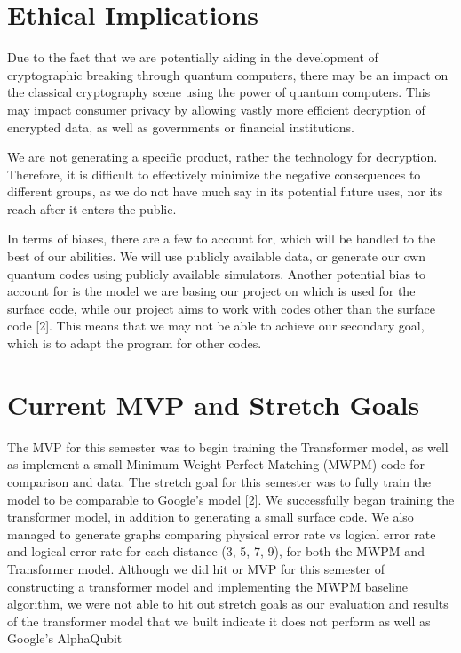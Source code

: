 \documentclass[12pt]{article}
\begin{document}
\section{Ethical Implications}

Due to the fact that we are potentially aiding in the development of cryptographic breaking through quantum computers, there may be an impact on the classical 
cryptography scene using the power of quantum computers. This may impact consumer privacy by allowing vastly more efficient decryption of encrypted data, 
as well as governments or financial institutions. 

We are not generating a specific product, rather the technology for decryption. 
Therefore, it is difficult to effectively minimize the negative consequences to different groups, as we do not have much say in its potential 
future uses, nor its reach after it enters the public. 

In terms of biases, there are a few to account for, which will be handled to the best of our abilities. We will use publicly available data, 
or generate our own quantum codes using publicly available simulators. Another potential bias to account for is the model we are basing our 
project on which is used for the surface code, while our project aims to work with codes other than the surface code [2]. This means that we 
may not be able to achieve our secondary goal, which is to adapt the program for other codes.

\section{Current MVP and Stretch Goals}

The MVP for this semester was to begin training the Transformer model, as well as implement a small Minimum Weight Perfect Matching (MWPM) 
code for comparison and data. The stretch goal for this semester was to fully train the model to be comparable to Google’s model [2]. 
We successfully began training the transformer model, in addition to generating a small surface code. We also managed to generate graphs 
comparing physical error rate vs logical error rate and logical error rate for each distance (3, 5, 7, 9), for both the MWPM and Transformer 
model. Although we did hit or MVP for this semester of constructing a transformer model and implementing the MWPM baseline algorithm, we 
were not able to hit out stretch goals as our evaluation and results of the transformer model that we built indicate it does not perform 
as well as Google’s AlphaQubit
\end{document}

